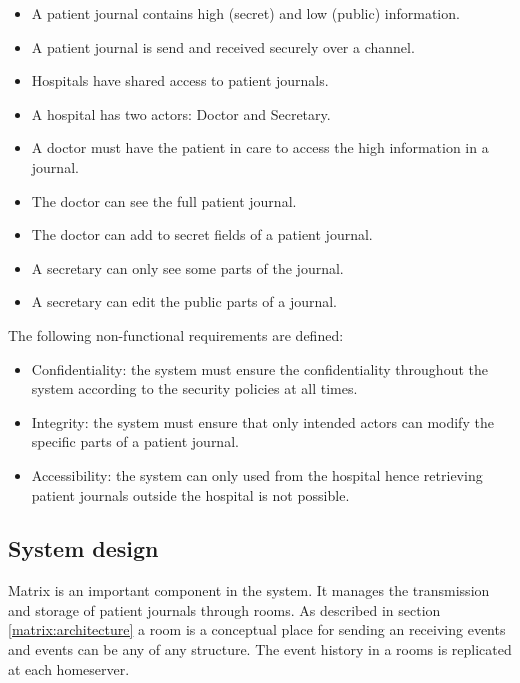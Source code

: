 \begin{itemize}
	\item A patient journal contains high (secret) and low (public) information.
	\item A patient journal is send and received securely over a channel.
	\item Hospitals have shared access to patient journals. 
	\item A hospital has two actors: Doctor and Secretary.
	\item A doctor must have the patient in care to access the high information in a journal.
	\item The doctor can see the full patient journal.
	\item The doctor can add to secret fields of a patient journal.
	\item A secretary can only see some parts of the journal.
	\item A secretary can edit the public parts of a journal.
\end{itemize}

The following non-functional requirements are defined:

\begin{itemize}
	\item Confidentiality: the system must ensure the confidentiality throughout the system according to the security policies at all times.
	\item Integrity: the system must ensure that only intended actors can modify the specific parts of a patient journal.
	\item Accessibility: the system can only used from the hospital hence retrieving patient journals outside the hospital is not possible.
\end{itemize}


\subsection{System design}

Matrix is an important component in the system. It manages the transmission and storage of patient journals through rooms. As described in section \ref{matrix:architecture} a room is a conceptual place for sending an receiving events and events can be any of any structure. The event history in a rooms is replicated at each homeserver. 

